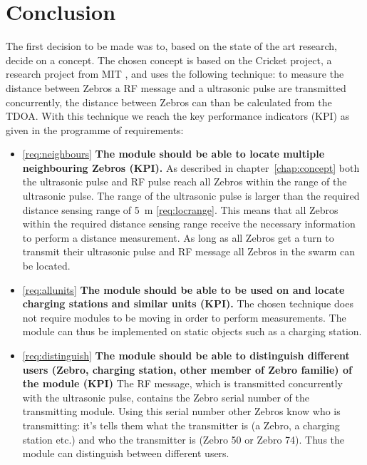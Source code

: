 \chapter{Conclusion}
\label{chap:conc}
The first decision to be made was to, based on the state of the art research, decide on a concept.
The chosen concept is based on the Cricket project, a research project from MIT \cite{Priyantha2000,Priyantha2005,Balakrishnan2003,Smith2005}, and uses the following technique:
to measure the distance between Zebros a RF message and a ultrasonic pulse are transmitted concurrently, the distance between Zebros can than be calculated from the TDOA.
With this technique we reach the key performance indicators (KPI) as given in the programme of requirements:

\begin{itemize}
  \item
    \ref{req:neighbours} \textbf{The module should be able to locate multiple neighbouring Zebros (KPI).}
    As described in chapter~\ref{chap:concept} both the ultrasonic pulse and RF pulse reach all Zebros within the range of the ultrasonic pulse.
    The range of the ultrasonic pulse is larger than the required distance sensing range of \SI{5}{\meter} \ref{req:locrange}.
    This means that all Zebros within the required distance sensing range receive the necessary information to perform a distance measurement.
    As long as all Zebros get a turn to transmit their ultrasonic pulse and RF message all Zebros in the swarm can be located.
  \item
    \ref{req:allunits} \textbf{The module should be able to be used on and locate charging stations and similar units (KPI).}
    The chosen technique does not require modules to be moving in order to perform measurements.
    The module can thus be implemented on static objects such as a charging station.
  \item
    \ref{req:distinguish} \textbf{The module should be able to distinguish different users (Zebro, charging station, other member of Zebro familie) of the module (KPI)}
    The RF message, which is transmitted concurrently with the ultrasonic pulse, contains the Zebro serial number of the transmitting module.
    Using this serial number other Zebros know who is transmitting: it's tells them what the transmitter is (a Zebro, a charging station etc.) and who the transmitter is (Zebro 50 or Zebro 74).
    Thus the module can distinguish between different users.
\end{itemize}

